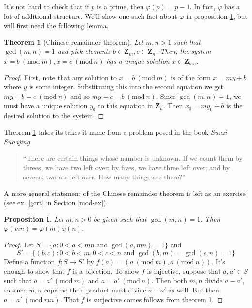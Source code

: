 \documentclass[12pt]{article}
\numberwithin{equation}{subsection}
\newtheorem{thm}[subsection]{Theorem}
\newtheorem{prop}[subsection]{Proposition}
\theoremstyle{note}
\newcommand{\Mod}[1]{\ (\mathrm{mod}\ #1)}
\begin{document}
It's not hard to check that if $p$ is a prime, then $\varphi(p)=p-1$. In fact, $\varphi$ has a lot of additional structure. We'll show one such fact about $\varphi$ in proposition \ref{mult-varphi}, but will first need the following lemma.


\begin{thm}[Chinese remainder theorem] \label{crt}
Let $m,n>1$ such that $\gcd(m,n)=1$ and pick elements $b\in\mathbf{Z}_m,c\in\mathbf{Z}_n$. Then, the system $x=b\Mod{m},x=c\Mod{n}$ has a unique solution $x\in\mathbf{Z}_{mn}$.
\end{thm}
	
\begin{proof} First, note that any solution to $x=b\Mod{m}$ is of the form $x=my+b$ where $y$ is some integer. Substituting this into the second equation we get $my+b=c\Mod{n}$ and so $my=c-b\Mod{n}$. Since $\gcd(m,n)=1$, we must have a unique solution $y_0$ to this equation in $\mathbf{Z}_n$. Then $x_0=my_0+b$ is the desired solution to the system. 
\end{proof}

Theorem \ref{crt} takes its takes it name from a problem posed in the book \textit{Sunzi Suanjing}\begin{quote}``There are certain things whose number is unknown. If we count them by threes, we have two left over; by fives, we have three left over; and by sevens, two are left over. How many things are there?''\end{quote}
A more general statement of the Chinese remainder theorem is left as an exercise (see ex. \ref{gcrt} in Section \ref{mod-ex}).

\begin{prop} \label{mult-varphi}
	Let $m,n>0$ be given such that $\gcd(m,n)=1$. Then $\varphi(mn)=\varphi(m)\varphi(n)$.
\end{prop} 


\begin{proof}Let $S=\{ a : 0 < a < mn \text{ and } \gcd(a,mn)=1\}$ and \[S'=\{(b,c) : 0<b<m, 0<c<n \text{ and } \gcd(b,m)=\gcd(c,n)=1\}\] Define a function $f\colon S\to S'$ by $f(a)=(a\Mod{m},a\Mod{n})$. It's enough to show that $f$ is a bijection. To show $f$ is injective, suppose that $a,a'\in S$ such that $a=a'\Mod{m}$ and $a=a'\Mod{n}$. Then both $m,n$ divide $a-a'$, so since $m,n$ coprime their product must divide $a-a'$ as well. But then $a=a'\Mod{mn}$. That $f$ is surjective comes follows from theorem \ref{crt}.\end{proof}
\end{document}
